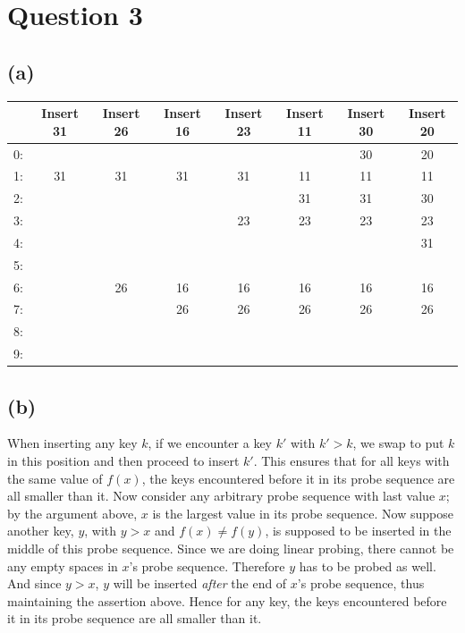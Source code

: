\documentclass{article}[12pt]
\begin{document}
\section*{Question 3}
\subsection*{(a)}

\begin{tabular}{r|c|c|c|c|c|c|c|}
    & Insert 31 & Insert 26 & Insert 16 & Insert 23 & Insert 11 & Insert 30 & Insert 20 \\
\hline
0:  &           &           &           &           &           & 30        & 20        \\
\hline
1:  & 31        & 31        & 31        & 31        & 11        & 11        & 11        \\
\hline
2:  &           &           &           &           & 31        & 31        & 30        \\
\hline
3:  &           &           &           & 23        & 23        & 23        & 23        \\
\hline
4:  &           &           &           &           &           &           & 31        \\
\hline
5:  &           &           &           &           &           &           &           \\
\hline
6:  &           & 26        & 16        & 16        & 16        & 16        & 16        \\
\hline
7:  &           &           & 26        & 26        & 26        & 26        & 26        \\
\hline
8:  &           &           &           &           &           &           &           \\
\hline
9:  &           &           &           &           &           &           &           \\
\hline
\end{tabular}

\subsection*{(b)}
When inserting any key $k$, if we encounter a key $k'$ with $k'>k$, we swap to put $k$ in this position and then proceed to insert $k'$.
This ensures that for all keys with the same value of $f(x)$, the keys encountered before it in its probe sequence are all smaller than it.
Now consider any arbitrary probe sequence with last value $x$; by the argument above, $x$ is the largest value in its probe sequence.
Now suppose another key, $y$, with $y>x$ and $f(x) \neq f(y)$, is supposed to be inserted in the middle of this probe sequence. Since
we are doing linear probing, there cannot be any empty spaces in $x$'s probe sequence. Therefore $y$ has to be probed as well. And since
$y>x$, $y$ will be inserted \emph{after} the end of $x$'s probe sequence, thus maintaining the assertion above. Hence for any key, the keys encountered before it in its probe sequence are all smaller than it.
\end{document}
